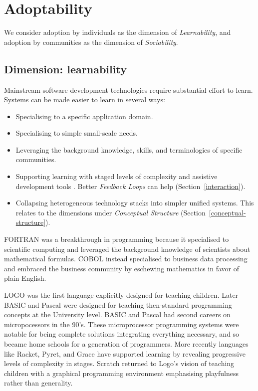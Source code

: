 \documentclass[ twoside,openright,titlepage,numbers=noenddot,headinclude,footinclude,cleardoublepage=empty,abstract=on,
                BCOR=5mm,paper=a4,fontsize=11pt
                ]{scrreprt}
\providecommand{\tightlist}{}\newenvironment{longtable}[2]{\begin{tabular}}{\end{tabular}}
\theoremstyle{definition}
\begin{document}
\hypertarget{adoptability}{\section{Adoptability}\label{adoptability}}


We consider adoption by individuals as the dimension of
\emph{Learnability}, and adoption by communities as the dimension of
\emph{Sociability}.

\hypertarget{dimension-learnability}{\subsection{Dimension: learnability}\label{dimension-learnability}}

Mainstream software development technologies require substantial effort
to learn. Systems can be made easier to learn in several ways:

\begin{itemize}
\tightlist
\item
  Specialising to a specific application domain.
\item
  Specialising to simple small-scale needs.
\item
  Leveraging the background knowledge, skills, and terminologies of
  specific communities.
\item
  Supporting learning with staged levels of complexity and assistive
  development tools \parencite{FullBrain}. Better \emph{Feedback Loops}
  can help (Section~\ref{interaction}).
\item
  Collapsing heterogeneous technology stacks into simpler unified
  systems. This relates to the dimensions under \emph{Conceptual
  Structure} (Section~\ref{conceptual-structure}).
\end{itemize}

FORTRAN was a breakthrough in programming because it specialised to
scientific computing and leveraged the background knowledge of
scientists about mathematical formulas. COBOL instead specialised to
business data processing and embraced the business community by
eschewing mathematics in favor of plain English.

LOGO was the first language explicitly designed for teaching children.
Later BASIC and Pascal were designed for teaching then-standard
programming concepts at the University level. BASIC and Pascal had
second careers on micropocessors in the 90's. These microprocessor
programming systems were notable for being complete solutions
integrating everything necessary, and so became home schools for a
generation of programmers. More recently languages like Racket, Pyret,
and Grace have supported learning by revealing progressive levels of
complexity in stages. Scratch returned to Logo's vision of teaching
children with a graphical programming environment emphasising
playfulness rather than generality.
\end{document}
